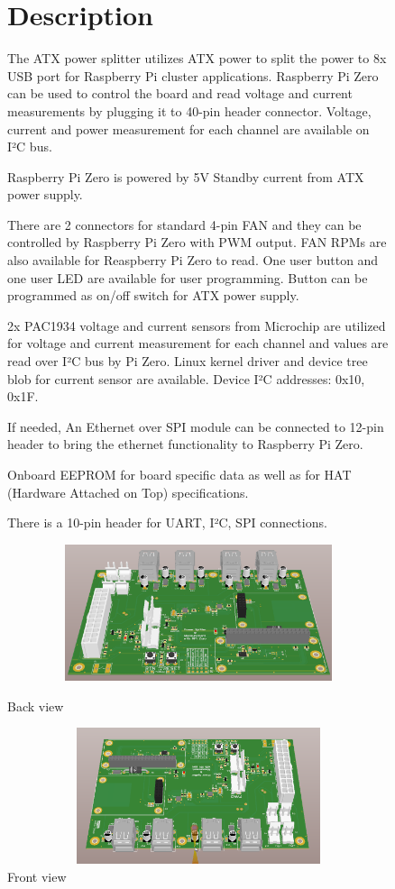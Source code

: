 \documentclass[a4paper,11pt,oneside,pdflatex,english,final,twocolumn]{article}
\begin{document}
\begin{figure}[ht]
	\begin{minipage}{1\textwidth}
		\section{Description}
		\par
		The ATX power splitter utilizes ATX power to split the power to 8x USB port for Raspberry Pi cluster applications. Raspberry Pi Zero can be used to control the board and read voltage and current measurements by plugging it to 40-pin header connector. Voltage, current and power measurement for each channel are available on I²C bus.
		\par
		Raspberry Pi Zero is powered by 5V Standby current from ATX power supply. 
		\par There are 2 connectors for standard 4-pin FAN and they can be controlled by Raspberry Pi Zero with PWM output. FAN RPMs are also available for Reaspberry Pi Zero to read. One user button and one user LED are available for user programming. Button can be programmed as on/off switch for ATX power supply. 
		\par
		2x PAC1934 voltage and current sensors from Microchip are utilized for voltage and current measurement for each channel and values are read over I²C bus by Pi Zero. Linux kernel driver and device tree blob for current sensor are available. Device I²C addresses: 0x10, 0x1F.
		\par
		If needed, An Ethernet over SPI module can be connected to 12-pin header to bring the ethernet functionality to Raspberry Pi Zero.
		\par 
		Onboard EEPROM for board specific data as well as for HAT (Hardware Attached on Top) specifications.
		\par 
		There is a 10-pin header for UART, I²C, SPI connections.
	\end{minipage}

	\vspace{1cm}
	\begin{minipage}{0.47\textwidth}
		\includegraphics[width=1.0\textwidth,right,height=4cm]{img/Alt_Front.png}
		\caption{Back view}
	\end{minipage}
	\hfill
	\begin{minipage}{0.47\textwidth}
		\includegraphics[width=1.0\textwidth,right,height=4cm]{img/Alt_Back.png}
		\caption{Front view}


\end{minipage}
\end{figure}
\end{document}
